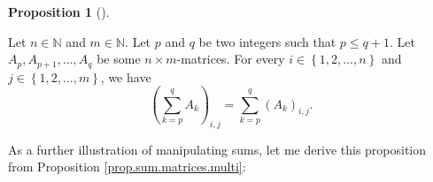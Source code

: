 \documentclass[numbers=enddot,12pt,final,onecolumn,notitlepage]{scrartcl}%
\theoremstyle{definition}
\newtheorem{prop}[theo]{Proposition}
\newenvironment{proposition}[1][]
{\begin{prop}[#1]\begin{leftbar}}
{\end{leftbar}\end{prop}}
\let\sumnonlimits\sum
\renewcommand{\sum}{\sumnonlimits\limits}
\begin{document}
\begin{proposition}
\label{prop.sum.matrices.multi.pq}Let $n\in\mathbb{N}$ and $m\in\mathbb{N}$.
Let $p$ and $q$ be two integers such that $p\leq q+1$. Let $A_{p}%
,A_{p+1},\ldots,A_{q}$ be some $n\times m$-matrices. For every $i\in\left\{
1,2,\ldots,n\right\}  $ and $j\in\left\{  1,2,\ldots,m\right\}  $, we have%
\begin{equation}
\left(  \sum_{k=p}^{q}A_{k}\right)  _{i,j}=\sum_{k=p}^{q}\left(  A_{k}\right)
_{i,j}. \label{eq.prop.sum.matrices.multi.pq.eq}%
\end{equation}

\end{proposition}

As a further illustration of manipulating sums, let me derive this proposition
from Proposition \ref{prop.sum.matrices.multi}:
\end{document}
